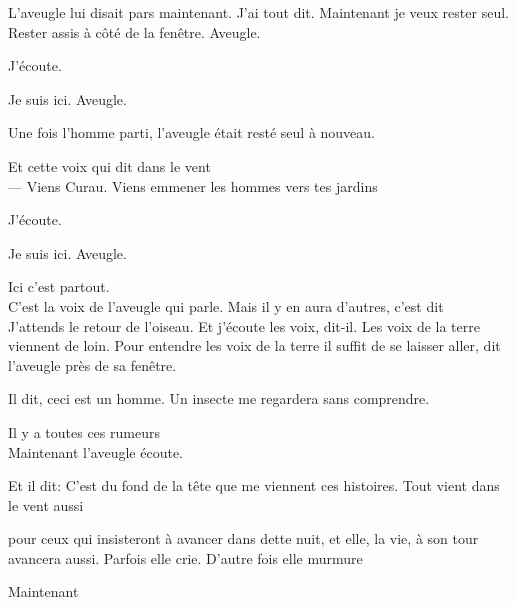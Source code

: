 L'aveugle lui disait pars maintenant. J'ai tout dit. Maintenant je veux
rester seul. Rester assis à côté de la fenêtre. Aveugle.

\pagebreak

\vspace*{4cm}

J'écoute.

Je suis ici. Aveugle.

\pagebreak

\vspace*{4cm}

Une fois l'homme parti, l'aveugle était resté seul à nouveau.

\pagebreak

\vspace*{4cm}

Et cette voix qui dit dans le vent\\

--- Viens Curau. Viens emmener les hommes vers tes jardins

\pagebreak

\vspace*{4cm}

J'écoute.

Je suis ici. Aveugle.

Ici c'est partout.\\

C'est la voix de l'aveugle qui parle. Mais il y en aura d'autres, c'est
dit\\

J'attends le retour de l'oiseau. Et j'écoute les voix, dit-il. Les voix
de la terre viennent de loin. Pour entendre les voix de la terre il
suffit de se laisser aller, dit l'aveugle près de sa fenêtre.

Il dit, ceci est un homme. Un insecte me regardera sans comprendre.

Il y a toutes ces rumeurs\\

Maintenant l'aveugle écoute.

Et il dit: C'est du fond de la tête que me viennent ces histoires. Tout
vient dans le vent aussi

pour ceux qui insisteront à avancer dans dette nuit, et elle, la vie, à
son tour avancera aussi. Parfois elle crie. D'autre fois elle murmure

\pagebreak

\vspace*{4cm}

Maintenant

